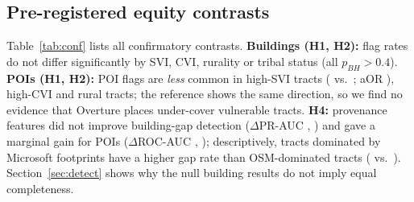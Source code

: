 \documentclass[11pt]{article}
\begin{document}
\subsection{Pre-registered equity contrasts}
Table~\ref{tab:conf} lists all confirmatory contrasts. \textbf{Buildings (H1, H2):} flag rates do not differ significantly by SVI, CVI, rurality or tribal status (all $p_{BH}>0.4$). \textbf{POIs (H1, H2):} POI flags are \emph{less} common in high-SVI tracts (\PoiSviHi{} vs.\ \PoiSviLo{}; aOR \PoiSviAor{}), high-CVI and rural tracts; the reference shows the same direction, so we find no evidence that Overture places under-cover vulnerable tracts. \textbf{H4:} provenance features did not improve building-gap detection ($\Delta$PR-AUC \HFourDprBldg{}, \HFourDprBldgCI{}) and gave a marginal gain for POIs ($\Delta$ROC-AUC \HFourDaucPoi{}, \HFourDaucPoiCI{}); descriptively, tracts dominated by Microsoft footprints have a higher gap rate than OSM-dominated tracts (\GapMsft{} vs.\ \GapOsm{}). Section~\ref{sec:detect} shows why the null building results do not imply equal completeness.

\begin{table}[t]\centering\small
\caption{Confirmatory contrasts (pre-registered). RD: risk difference; aOR: region-adjusted odds ratio; RR: hidden-exposure rate ratio; $\Delta$: difference in log-completeness change (H3a) or gap-rate change (H3b); $p_{BH}$: Benjamini--Hochberg adjusted.}\label{tab:conf}

\end{table}
\end{document}
